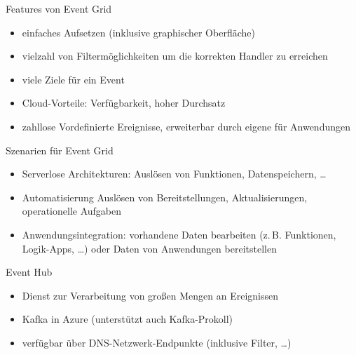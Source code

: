 \begin{flashcard}[]{Features von Event Grid}
  \begin{itemize}
    \item einfaches Aufsetzen (inklusive graphischer Oberfläche)
    \item vielzahl von Filtermöglichkeiten um die korrekten Handler zu erreichen
    \item viele Ziele für ein Event
    \item Cloud-Vorteile: Verfügbarkeit, hoher Durchsatz
    \item zahllose Vordefinierte Ereignisse, erweiterbar durch eigene für Anwendungen
  \end{itemize}
\end{flashcard}

\begin{flashcard}[]{Szenarien für Event Grid}
  \begin{itemize}
    \item Serverlose Architekturen:\newline
      Auslösen von Funktionen, Datenspeichern, \ldots
    \item Automatisierung\newline
      Auslösen von Bereitstellungen, Aktualisierungen, operationelle Aufgaben
    \item Anwendungsintegration:\newline
      vorhandene Daten bearbeiten (z.\,B. Funktionen, Logik-Apps, \ldots) oder Daten von Anwendungen bereitstellen
  \end{itemize}
\end{flashcard}

\begin{flashcard}[]{Event Hub}
  \begin{itemize}
    \item Dienst zur Verarbeitung von großen Mengen an Ereignissen
    \item Kafka in Azure (unterstützt auch Kafka-Prokoll)
    \item verfügbar über DNS-Netzwerk-Endpunkte (inklusive Filter, \ldots)
  \end{itemize}
\end{flashcard}

